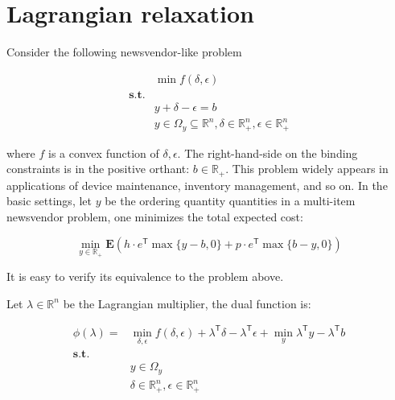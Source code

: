 \documentclass[
  a4paper,
,tablecaptionabove
]{scrartcl}
\author{Chuwen}
\date{\today}
\title{}
\author{Chuwen}
\numberwithin{equation}{section}
\begin{document}




{
\setcounter{tocdepth}{3}
\tableofcontents
}
\hypertarget{lagrangian-relaxation}{%
  \section{Lagrangian relaxation}\label{lagrangian-relaxation}}

Consider the following newsvendor-like problem

\[\begin{aligned}
                  & \min f(\delta, \epsilon)                                                                       \\
    \mathbf{s.t.} &                                                                                                \\
                  & y + \delta - \epsilon = b                                                                      \\
                  & y \in \Omega_y \subseteq \mathbb{R}^n, \delta \in \mathbb{R}^n_+ , \epsilon \in \mathbb{R}^n_+
  \end{aligned}\]

where \(f\) is a convex function of \(\delta, \epsilon\). The
right-hand-side on the binding constraints is in the positive orthant:
\(b \in \mathbb R_+.\) This problem widely appears in applications of
device maintenance, inventory management, and so on. In the basic
settings, let \(y\) be the ordering quantity quantities in a multi-item
newsvendor problem, one minimizes the total expected cost:

\[\min_{y \in \mathbb R_+} \mathbf E\left(h\cdot e^\mathsf{T} \max\{y - b,  0\} + p \cdot e^\mathsf{T} \max\{b - y,  0\}\right)\]

It is easy to verify its equivalence to the problem above.

Let \(\lambda\in\mathbb{R}^n\) be the Lagrangian multiplier, the dual
function is:

\[\begin{aligned}
    \phi(\lambda) = & \min_{\delta, \epsilon} f(\delta, \epsilon) + \lambda^\mathsf{T}\delta - \lambda^\mathsf{T} \epsilon+ \min_y \lambda^\mathsf{T} y - \lambda^\mathsf{T} b \\
    \mathbf{s.t.}   &                                                                                                                                                          \\
                    & y \in \Omega_y                                                                                                                                           \\
                    & \delta \in \mathbb{R}^n_+ , \epsilon \in \mathbb{R}^n_+
  \end{aligned}\]
\end{document}
